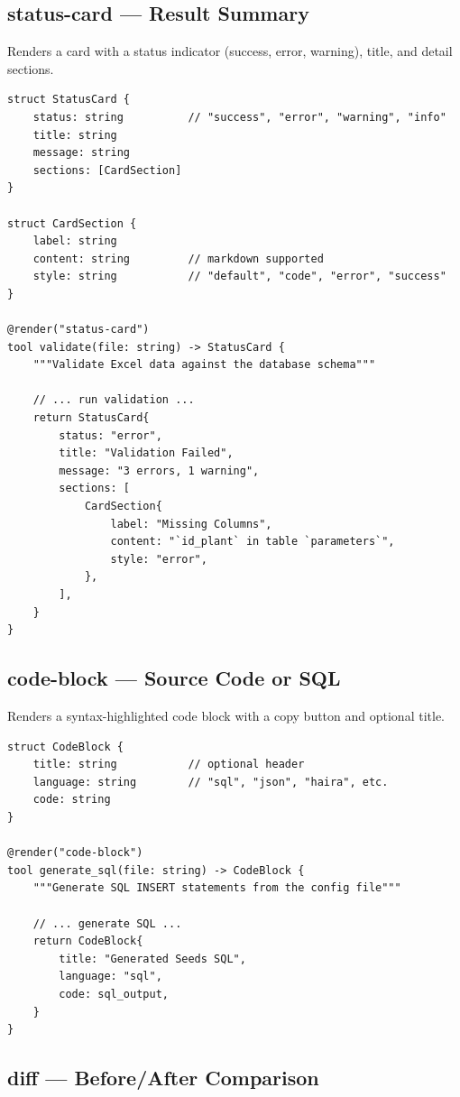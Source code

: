 \subsection{status-card --- Result Summary}

Renders a card with a status indicator (success, error, warning), title, and detail sections.

\begin{lstlisting}
struct StatusCard {
    status: string          // "success", "error", "warning", "info"
    title: string
    message: string
    sections: [CardSection]
}

struct CardSection {
    label: string
    content: string         // markdown supported
    style: string           // "default", "code", "error", "success"
}

@render("status-card")
tool validate(file: string) -> StatusCard {
    """Validate Excel data against the database schema"""

    // ... run validation ...
    return StatusCard{
        status: "error",
        title: "Validation Failed",
        message: "3 errors, 1 warning",
        sections: [
            CardSection{
                label: "Missing Columns",
                content: "`id_plant` in table `parameters`",
                style: "error",
            },
        ],
    }
}
\end{lstlisting}

\subsection{code-block --- Source Code or SQL}

Renders a syntax-highlighted code block with a copy button and optional title.

\begin{lstlisting}
struct CodeBlock {
    title: string           // optional header
    language: string        // "sql", "json", "haira", etc.
    code: string
}

@render("code-block")
tool generate_sql(file: string) -> CodeBlock {
    """Generate SQL INSERT statements from the config file"""

    // ... generate SQL ...
    return CodeBlock{
        title: "Generated Seeds SQL",
        language: "sql",
        code: sql_output,
    }
}
\end{lstlisting}

\subsection{diff --- Before/After Comparison}

